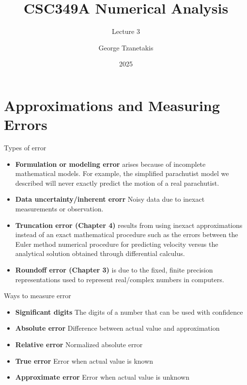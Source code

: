 \documentclass[12pt]{beamer}
\title[CSC349A Numerical Analysis]{CSC349A Numerical Analysis}
\subtitle[Leture 3]{Lecture 3}
\date[2025]{2025}
\author[George Tzanetakis]{George Tzanetakis}
\institute[University of Victoria]{University of Victoria}
\begin{document}
\frame{\maketitle} %





\section{Approximations and Measuring Errors} 

\begin{frame}{Types of error}
\begin{itemize} 
\item{{\bf Formulation or modeling error}  arises because of
    incomplete mathematical models. For example, the simplified
    parachutist model we described will never exactly predict the
    motion of a real parachutist.}

\item{{\bf Data uncertainty/inherent erorr} Noisy data due to inexact
    measurements or observation.}

\item{{\bf Truncation error (Chapter 4)} results from using inexact approximations
    instead of an exact mathematical procedure such as the errors
    between the Euler method numerical procedure for predicting
    velocity versus the analytical solution obtained through
    differential calculus.}

\item{{\bf Roundoff error (Chapter 3)} is due to the fixed, finite
    precision representations used to represent real/complex numbers
    in computers.}


\end{itemize} 
\end{frame}


\begin{frame}{Ways to measure error}
\begin{itemize} 
\item{{\bf Significant digits} The digits of a number that can be used with confidence}
\vspace{\baselineskip}
\item{{\bf Absolute error} Difference between actual value and approximation}
\vspace{\baselineskip}
\item{{\bf Relative error} Normalized absolute error}
\vspace{\baselineskip}
\item{{\bf True error} Error when actual value is known}
\vspace{\baselineskip}
\item{{\bf Approximate error} Error when actual value is unknown}

\end{itemize} 
\end{frame}
\end{document}
